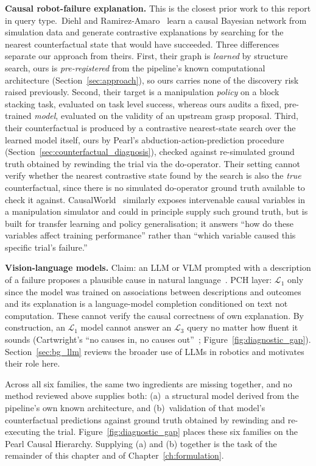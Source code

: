 \documentclass[11pt,a4paper]{report}
\begin{document}
\textbf{Causal robot-failure explanation.} This is the closest prior work to this report in query type.~Diehl and Ramirez-Amaro~\cite{diehl2022whydidifail} learn a causal Bayesian network from simulation data and generate contrastive explanations by searching for the nearest counterfactual state that would have succeeded. Three differences separate our approach from theirs. First, their graph is \emph{learned} by structure search, ours is \emph{pre-registered} from the pipeline's known computational architecture (Section~\ref{sec:approach}), so ours carries none of the discovery risk raised previously. Second, their target is a manipulation \emph{policy} on a block stacking task, evaluated on task level success, whereas ours audits a fixed, pre-trained \emph{model}, evaluated on the validity of an upstream grasp proposal. Third, their counterfactual is produced by a contrastive nearest-state search over the learned model itself, ours by Pearl's abduction-action-prediction procedure (Section~\ref{sec:counterfactual_diagnosis}), checked against re-simulated ground truth obtained by rewinding the trial via the do-operator. Their setting cannot verify whether the nearest contrastive state found by the search is also the \emph{true} counterfactual, since there is no simulated do-operator ground truth available to check it against. CausalWorld~\cite{ahmed2021causalworld} similarly exposes intervenable causal variables in a manipulation simulator and could in principle supply such ground truth, but is built for transfer learning and policy generalisation; it answers ``how do these variables affect training performance'' rather than ``which variable caused this specific trial's failure.''

\textbf{Vision-language models.} Claim: an LLM or VLM prompted with a description of a failure proposes a plausible cause in natural language~\cite{ahn2022saycan, driess2023palm}. PCH layer: $\mathcal{L}_1$ only since the model was trained on associations between descriptions and outcomes and its explanation is a language-model completion conditioned on text not computation. These cannot verify the causal correctness of own explanation. By construction, an $\mathcal{L}_1$ model cannot answer an $\mathcal{L}_3$ query no matter how fluent it sounds (Cartwright's ``no causes in, no causes out''~\cite{cartwright1989}; Figure~\ref{fig:diagnostic_gap}). Section~\ref{sec:bg_llm} reviews the broader use of LLMs in robotics and motivates their role here.

Across all six families, the same two ingredients are missing together, and no method reviewed above supplies both: (a)~a structural model derived from the pipeline's own known architecture, and (b)~validation of that model's counterfactual predictions against ground truth obtained by rewinding and re-executing the trial. Figure~\ref{fig:diagnostic_gap} places these six families on the Pearl Causal Hierarchy. Supplying (a) and (b) together is the task of the remainder of this chapter and of Chapter~\ref{ch:formulation}.
\end{document}
